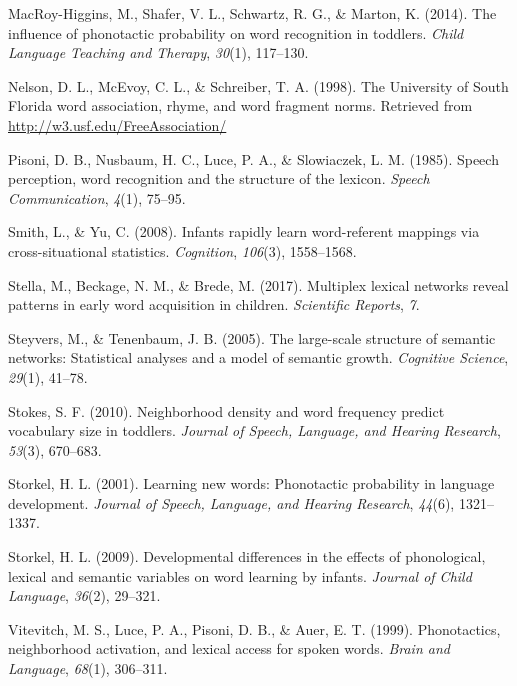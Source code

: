 \documentclass[10pt, letterpaper]{article}
\begin{document}
\hypertarget{ref-higgins2014}{}
MacRoy-Higgins, M., Shafer, V. L., Schwartz, R. G., \& Marton, K.
(2014). The influence of phonotactic probability on word recognition in
toddlers. \emph{Child Language Teaching and Therapy}, \emph{30}(1),
117--130.

\hypertarget{ref-nelson1998}{}
Nelson, D. L., McEvoy, C. L., \& Schreiber, T. A. (1998). The University
of South Florida word association, rhyme, and word fragment norms.
Retrieved from \url{http://w3.usf.edu/FreeAssociation/}

\hypertarget{ref-pisoni1985}{}
Pisoni, D. B., Nusbaum, H. C., Luce, P. A., \& Slowiaczek, L. M. (1985).
Speech perception, word recognition and the structure of the lexicon.
\emph{Speech Communication}, \emph{4}(1), 75--95.

\hypertarget{ref-smith2008}{}
Smith, L., \& Yu, C. (2008). Infants rapidly learn word-referent
mappings via cross-situational statistics. \emph{Cognition},
\emph{106}(3), 1558--1568.

\hypertarget{ref-stella2017}{}
Stella, M., Beckage, N. M., \& Brede, M. (2017). Multiplex lexical
networks reveal patterns in early word acquisition in children.
\emph{Scientific Reports}, \emph{7}.

\hypertarget{ref-steyvers2005}{}
Steyvers, M., \& Tenenbaum, J. B. (2005). The large-scale structure of
semantic networks: Statistical analyses and a model of semantic growth.
\emph{Cognitive Science}, \emph{29}(1), 41--78.

\hypertarget{ref-stokes2010}{}
Stokes, S. F. (2010). Neighborhood density and word frequency predict
vocabulary size in toddlers. \emph{Journal of Speech, Language, and
Hearing Research}, \emph{53}(3), 670--683.

\hypertarget{ref-storkel2001}{}
Storkel, H. L. (2001). Learning new words: Phonotactic probability in
language development. \emph{Journal of Speech, Language, and Hearing
Research}, \emph{44}(6), 1321--1337.

\hypertarget{ref-storkel2009}{}
Storkel, H. L. (2009). Developmental differences in the effects of
phonological, lexical and semantic variables on word learning by
infants. \emph{Journal of Child Language}, \emph{36}(2), 29--321.

\hypertarget{ref-vitevitch1999}{}
Vitevitch, M. S., Luce, P. A., Pisoni, D. B., \& Auer, E. T. (1999).
Phonotactics, neighborhood activation, and lexical access for spoken
words. \emph{Brain and Language}, \emph{68}(1), 306--311.
\end{document}
